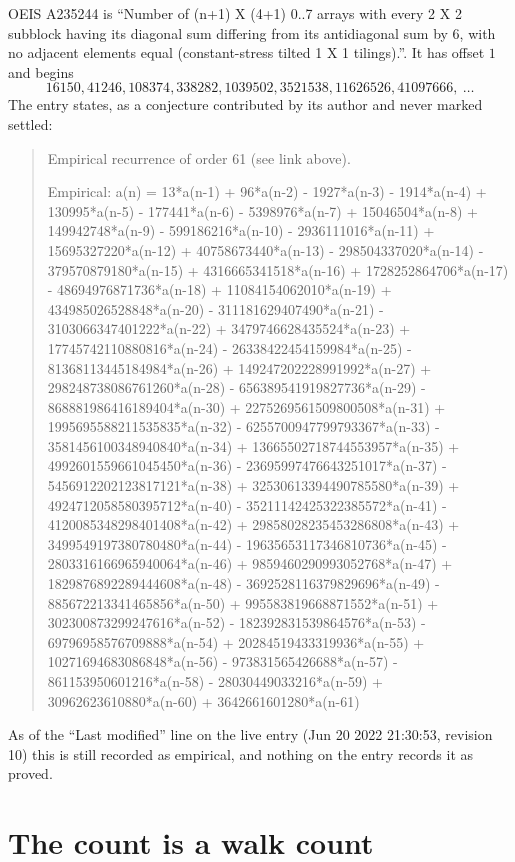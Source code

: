 \documentclass[11pt,a4paper]{article}
\theoremstyle{plain}
\theoremstyle{definition}
\begin{document}
OEIS A235244 is ``Number of (n+1) X (4+1) 0..7 arrays with every 2 X 2 subblock having its diagonal sum differing from its antidiagonal sum by 6, with no adjacent elements equal (constant-stress tilted 1 X 1 tilings).''. It has offset $1$ and begins
\[
16150, 41246, 108374, 338282, 1039502, 3521538, 11626526, 41097666,\ \dots
\]
The entry states, as a conjecture contributed by its author and never marked settled:
\begin{quote}\raggedright\small
Empirical recurrence of order 61 (see link above).

Empirical: a(n) = 13*a(n-1) + 96*a(n-2) - 1927*a(n-3) - 1914*a(n-4) + 130995*a(n-5) - 177441*a(n-6) - 5398976*a(n-7) + 15046504*a(n-8) + 149942748*a(n-9) - 599186216*a(n-10) - 2936111016*a(n-11) + 15695327220*a(n-12) + 40758673440*a(n-13) - 298504337020*a(n-14) - 379570879180*a(n-15) + 4316665341518*a(n-16) + 1728252864706*a(n-17) - 48694976871736*a(n-18) + 11084154062010*a(n-19) + 434985026528848*a(n-20) - 311181629407490*a(n-21) - 3103066347401222*a(n-22) + 3479746628435524*a(n-23) + 17745742110880816*a(n-24) - 26338422454159984*a(n-25) - 81368113445184984*a(n-26) + 149247202228991992*a(n-27) + 298248738086761260*a(n-28) - 656389541919827736*a(n-29) - 868881986416189404*a(n-30) + 2275269561509800508*a(n-31) + 1995695588211535835*a(n-32) - 6255700947799793367*a(n-33) - 3581456100348940840*a(n-34) + 13665502718744553957*a(n-35) + 4992601559661045450*a(n-36) - 23695997476643251017*a(n-37) - 5456912202123817121*a(n-38) + 32530613394490785580*a(n-39) + 4924712058580395712*a(n-40) - 35211142425322385572*a(n-41) - 4120085348298401408*a(n-42) + 29858028235453286808*a(n-43) + 3499549197380780480*a(n-44) - 19635653117346810736*a(n-45) - 2803316166965940064*a(n-46) + 9859460290993052768*a(n-47) + 1829876892289444608*a(n-48) - 3692528116379829696*a(n-49) - 885672213341465856*a(n-50) + 995583819668871552*a(n-51) + 302300873299247616*a(n-52) - 182392831539864576*a(n-53) - 69796958576709888*a(n-54) + 20284519433319936*a(n-55) + 10271694683086848*a(n-56) - 973831565426688*a(n-57) - 861153950601216*a(n-58) - 28030449033216*a(n-59) + 30962623610880*a(n-60) + 3642661601280*a(n-61)
\end{quote}
As of the ``Last modified'' line on the live entry (Jun 20 2022 21:30:53, revision 10) this is still
recorded as empirical, and nothing on the entry records it as proved.

\section{The count is a walk count}
\end{document}

